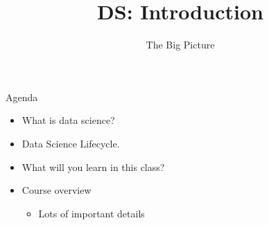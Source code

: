 \documentclass[aspectratio=169]{../latex_main/tntbeamer}  %
\title[Introduction]{DS: Introduction}
\subtitle{The Big Picture}
\begin{document}
	
	\maketitle


	\begin{frame}[c]{Agenda}
		
		\begin{itemize}
		    \item What is data science?
		    \item Data Science Lifecycle.
		    \item What will you learn in this class?
		    \item Course overview
		    \begin{itemize}
		        \item Lots of important details
		    \end{itemize}
		\end{itemize}
		
	\end{frame}
	
	
	
	
\end{document}
